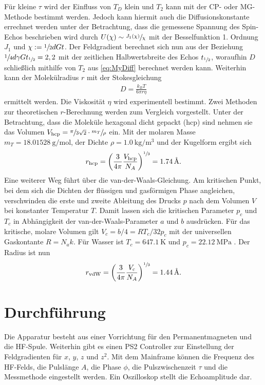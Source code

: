 Für kleine $\tau$ wird der Einfluss von $T_D$ klein und $T_2$ kann mit der CP- oder MG-Methode bestimmt werden. Jedoch kann hiermit auch 
die Diffusionskonstante errechnet werden unter der Betrachtung, dass die gemessene Spannung des Spin-Echos beschrieben wird durch
$U(\chi)\sim \sfrac{J_1(\chi)}{\chi}$ mit der Besselfunktion 1. Ordnung $J_1$ und $\chi:=\sfrac12 d G t$. Der Feldgradient berechnet sich nun aus 
der Beziehung $\sfrac14 d \gamma G t_{\sfrac12} = 2,2$ mit der zeitlichen Halbwertsbreite des Echos $t_{\sfrac12}$, woraufhin $D$ schließlich 
mithilfe von $T_2$ aus \eqref{eq:MyDiff} berechnet werden kann. Weiterhin kann der Molekülradius $r$ mit der Stokesgleichung
\begin{align}
 D = \frac{k_B T}{6\pi r \eta}
\end{align}
ermittelt werden. Die Viskosität $\eta$ wird experimentell bestimmt. Zwei Methoden zur theoretischen $r$-Berechnung werden zum Vergleich
vorgestellt. Unter der Betrachtung, dass die Moleküle hexagonal dicht gepackt (hcp) sind nehmen sie das Volumen 
$V_\text{hcp}=\sfrac{\pi}{3\sqrt{2}}\cdot\sfrac{m_T}{\rho}$ ein. Mit der molaren Masse $m_T=\SI{18.01528}{\g\per\mol}$, der Dichte 
$\rho = \SI{1,0}{\kg\per\m\cubed}$ \cite{conv} und der Kugelform ergibt sich
\begin{align}
 r_\text{hcp}=\left(\frac{3}{4\pi}\frac{V_\text{hcp}}{N_A} \right)^{\sfrac13} = \SI{1,74}{\angstrom}.
 \label{eq:radhcp}
\end{align}
Eine weiterer Weg führt über die van-der-Waals-Gleichung. Am kritischen Punkt, bei dem sich die Dichten der flüssigen und gasförmigen Phase 
angleichen, verschwinden die erste und zweite Ableitung des Drucks $p$ nach dem Volumen $V$ bei konstanter Temperatur $T$. Damit lassen sich
die kritischen Parameter $p_c$ und $T_c$ in Abhängigkeit der van-der-Waals-Parameter $a$ und $b$ ausdrücken. Für das kritische, molare 
Volumen gilt $V_c = b/4 = RT_c/32p_c$ mit der universellen Gaskontante $R=N_ak$. Für Wasser ist $T_c=\SI{647,1}{\K}$ und $p_c=\SI{22,12}{\MPa}$
\cite{chemie}. Der Radius ist nun
\begin{align}
 r_\text{vdW}=\left(\frac{3}{4\pi}\frac{V_\text{c}}{N_A}\right)^{\sfrac13} = \SI{1,44}{\angstrom}.
 \label{eq:radvdw}
\end{align}


\section{Durchführung}
Die Apparatur besteht aus einer Vorrichtung für den Permanentmagneten und die HF-Spule. Weiterhin gibt es einen PS2 Controller zur Einstellung
der Feldgradienten für $x$, $y$, $z$ und $z^2$. Mit dem Mainframe können die Frequenz des HF-Felds, die Pulslänge $A$, die Phase $\phi$, 
die Pulszwischenzeit $\tau$ und die Messmethode eingestellt werden. Ein Oszilloskop stellt die Echoamplitude dar.
